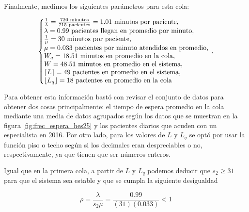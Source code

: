 \documentclass[10pt]{article}
\begin{document}
    Finalmente, medimos los siguientes parámetros para esta cola: 
    
    \begin{equation*}
    	\left\{
    	\begin{array}{@{}l@{}}
    		\frac{1}{\lambda} = \frac{720 \text{ minutos}}{715 \text{ pacientes}} = 1.01 \text{ minutos por paciente,} \\
    		\lambda = 0.99 \text{ pacientes llegan en promedio por minuto,} \\
    		\frac{1}{\mu} = 30 \text{ minutos por paciente,} \\
    		\mu = 0.033 \text{ pacientes por minuto atendidos en promedio,} \\
    		W_{q} = 18.51 \text{ minutos en promedio en la cola,} \\
    		W = 48.51 \text{ minutos en promedio en el sistema,} \\
    		\left\lceil L \right\rceil = 49 \text{ pacientes en promedio en el sistema,} \\
    		\left\lfloor L_{q} \right\rfloor = 18 \text{ pacientes en promedio en la cola}
    	\end{array}
    	\right.\,.
    \end{equation*}
    
    Para obtener esta información bastó con revisar el conjunto de datos para obtener dos cosas principalmente: el tiempo de espera promedio en la cola mediante una media de datos agrupados según los datos que se muestran en la figura \ref{fig:frec_espera_hes25} y los pacientes diarios que acuden con un especialista en 2016. Por otro lado, para los valores de $L$ y $L_{q}$ se optó por usar la función piso o techo según si los decimales eran despreciables o no, respectivamente, ya que tienen que ser números enteros.
    
    Igual que en la primera cola, a partir de $L$ y $L_{q}$ podemos deducir que $s_{2} \geq 31$ para que el sistema sea estable y que se cumpla la siguiente desigualdad
    
    \begin{equation*}
    	\rho = \frac{\lambda}{s_{2}\mu} = \frac{0.99}{(31)(0.033)} < 1
    \end{equation*}
    
\end{document}
